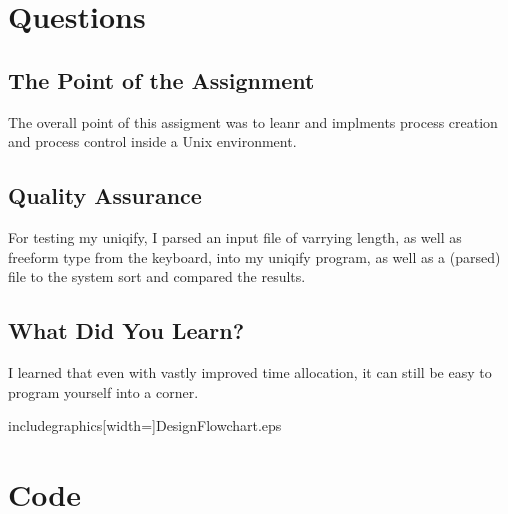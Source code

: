 \documentclass[letterpaper,10pt,titlepage]{article}
\begin{document}
\section{Questions}
\label{Project Quesions}
\subsection{The Point of the Assignment}
\label{Point}
The overall point of this assigment was to leanr and implments process creation and process control inside a Unix environment.
\subsection{Quality Assurance}
\label{QA}
For testing my uniqify, I parsed an input file of varrying length, as well as freeform type from the keyboard, into my uniqify program, as well as a (parsed) file to the system sort and compared the results.
\subsection{What Did You Learn?}
\label{Learned}
I learned that even with vastly improved time allocation, it can still be easy to program yourself into a corner.

includegraphics[width=\textwidth]{DesignFlowchart.eps}


\section{Code}
\label{myar Source Code}

\end{document}
